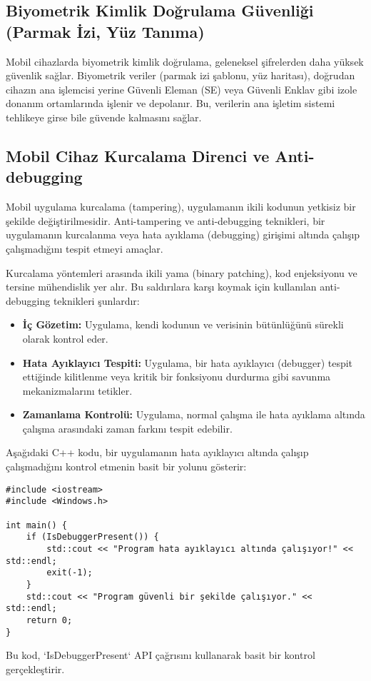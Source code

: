\subsection{Biyometrik Kimlik Doğrulama Güvenliği (Parmak İzi, Yüz Tanıma)}

Mobil cihazlarda biyometrik kimlik doğrulama, geleneksel şifrelerden daha yüksek güvenlik sağlar. Biyometrik veriler (parmak izi şablonu, yüz haritası), doğrudan cihazın ana işlemcisi yerine Güvenli Eleman (SE) veya Güvenli Enklav gibi izole donanım ortamlarında işlenir ve depolanır. Bu, verilerin ana işletim sistemi tehlikeye girse bile güvende kalmasını sağlar.

\subsection{Mobil Cihaz Kurcalama Direnci ve Anti-debugging}

Mobil uygulama kurcalama (tampering), uygulamanın ikili kodunun yetkisiz bir şekilde değiştirilmesidir. Anti-tampering ve anti-debugging teknikleri, bir uygulamanın kurcalanma veya hata ayıklama (debugging) girişimi altında çalışıp çalışmadığını tespit etmeyi amaçlar.

Kurcalama yöntemleri arasında ikili yama (binary patching), kod enjeksiyonu ve tersine mühendislik yer alır. Bu saldırılara karşı koymak için kullanılan anti-debugging teknikleri şunlardır:
\begin{itemize}
    \item \textbf{İç Gözetim:} Uygulama, kendi kodunun ve verisinin bütünlüğünü sürekli olarak kontrol eder.
    \item \textbf{Hata Ayıklayıcı Tespiti:} Uygulama, bir hata ayıklayıcı (debugger) tespit ettiğinde kilitlenme veya kritik bir fonksiyonu durdurma gibi savunma mekanizmalarını tetikler.
    \item \textbf{Zamanlama Kontrolü:} Uygulama, normal çalışma ile hata ayıklama altında çalışma arasındaki zaman farkını tespit edebilir.
\end{itemize}
Aşağıdaki C++ kodu, bir uygulamanın hata ayıklayıcı altında çalışıp çalışmadığını kontrol etmenin basit bir yolunu gösterir:
\begin{lstlisting}[breaklines=true,basicstyle=\ttfamily\footnotesize]
#include <iostream>
#include <Windows.h>

int main() {
    if (IsDebuggerPresent()) {
        std::cout << "Program hata ayıklayıcı altında çalışıyor!" << std::endl;
        exit(-1);
    }
    std::cout << "Program güvenli bir şekilde çalışıyor." << std::endl;
    return 0;
}
\end{lstlisting}
Bu kod, `IsDebuggerPresent` API çağrısını kullanarak basit bir kontrol gerçekleştirir.


